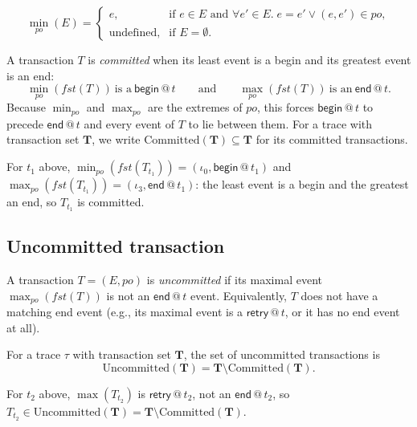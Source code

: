 \documentclass[manuscript,nonacm]{acmart}
\theoremstyle{acmdefinition}
\newcommand{\bbegin}{\textsf{begin}}
\newcommand{\eend}{\textsf{end}}
\newcommand{\retry}{\textsf{retry}}
\newcommand{\po}{\mathit{po}}
\begin{document}
\[
\operatorname{min}_{\po}(E) =
\begin{cases}
e, & \text{if } e \in E \text{ and } \forall e' \in E.\; e = e' \lor (e,e') \in \po,\\[0.8ex]
\text{undefined}, & \text{if } E = \emptyset.
\end{cases}
\]

\begin{definition}
A transaction $T$ is \emph{committed} when its least event is a begin and its
greatest event is an end:
\[
\operatorname{min}_{po}(fst(T))\ \text{is a}\ \bbegin\,@\,t \qquad\text{and}\qquad
\operatorname{max}_{po}(fst(T))\ \text{is an}\ \eend\,@\,t .
\]
Because $\min_{po}$ and $\max_{po}$ are the extremes of $\po$, this forces $\bbegin\,@\,t$ to
precede $\eend\,@\,t$ and every event of $T$ to lie between them. For a trace with
transaction set $\mathbf{T}$, we write $\mathrm{Committed}(\mathbf{T}) \subseteq
\mathbf{T}$ for its committed transactions.
\end{definition}

\begin{example}
For $t_1$ above, $\operatorname{min}_{po}(fst(T_{t_1})) = (\iota_0, \bbegin\,@\,t_1)$ and
$\operatorname{max}_{po}(fst(T_{t_1})) = (\iota_3, \eend\,@\,t_1)$: the least event is a begin and the
greatest an end, so $T_{t_1}$ is committed.
\end{example}

\subsection{Uncommitted transaction}
\begin{definition}
A transaction $T=(E,\po)$ is \emph{uncommitted} if its maximal event
$\operatorname{max}_{po}(fst(T))$ is not an $\eend\,@\,t$ event. Equivalently, $T$ does not have
a matching end event (e.g., its maximal event is a $\retry\,@\,t$, or it
has no end event at all).

For a trace $\tau$ with transaction set $\mathbf{T}$, the set of uncommitted
transactions is
\[
\mathrm{Uncommitted}(\mathbf{T})
=
\mathbf{T}\setminus \mathrm{Committed}(\mathbf{T}).
\]
\end{definition}

\begin{example}
For $t_2$ above, $\max(T_{t_2})$ is $\retry\,@\,t_2$, not an $\eend\,@\,t_2$, so
$T_{t_2} \in \mathrm{Uncommitted}(\mathbf{T}) = \mathbf{T} \setminus \mathrm{Committed}(\mathbf{T})$.
\end{example}
\end{document}
